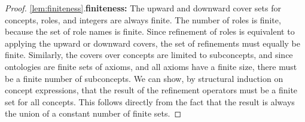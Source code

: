 \begin{proof}
  \item \ref{lem:finiteness}.\enspace \textbf{finiteness:\enspace}
  The upward and downward cover sets for concepts, roles, and integers are always finite. The number of roles is finite, because the set of role names is finite. Since refinement of roles is equivalent to applying the upward or downward covers, the set of refinements must equally be finite. Similarly, the covers over concepts are limited to subconcepts, and since ontologies are finite sets of axioms, and all axioms have a finite size, there must be a finite number of subconcepts. We can show, by structural induction on concept expressions, that the result of the refinement operators must be a finite set for all concepts. This follows directly from the fact that the result is always the union of a constant number of finite sets.


\end{proof}
